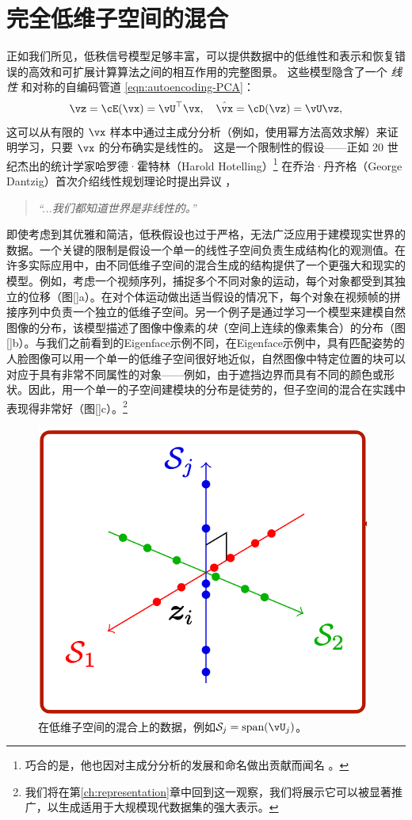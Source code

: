 \documentclass[../../book-main_zh.tex]{subfiles}
\begin{document}
\section{完全低维子空间的混合}%
\label{sec:ica}
正如我们所见，低秩信号模型足够丰富，可以提供数据中的低维性和表示和恢复错误的高效和可扩展计算算法之间的相互作用的完整图景。 
这些模型隐含了一个 \textit{线性} 和对称的自编码管道 \eqref{eqn:autoencoding-PCA}： 
\begin{equation*}
    \vz = \cE(\vx) = \vU^\top \vx, \quad \hat{\vx} = \cD(\vz) = \vU \vz,
\end{equation*}
这可以从有限的 $\vx$ 样本中通过主成分分析（例如，使用幂方法高效求解）来证明学习，只要 $\vx$ 的分布确实是线性的。
这是一个限制性的假设——正如 20 世纪杰出的统计学家哈罗德·霍特林（Harold Hotelling）\footnote{巧合的是，他也因对主成分分析的发展和命名做出贡献而闻名 \cite{Hotelling1933}。} 在乔治·丹齐格（George Dantzig）首次介绍线性规划理论时提出异议 \cite{Dantzig2002-eh}，
\begin{quote}
\centering
    \textit{“...我们都知道世界是非线性的。”}
\end{quote}

即使考虑到其优雅和简洁，低秩假设也过于严格，无法广泛应用于建模现实世界的数据。一个关键的限制是假设一个单一的线性子空间负责生成结构化的观测值。在许多实际应用中，由不同低维子空间的混合生成的结构提供了一个更强大和现实的模型。例如，考虑一个视频序列，捕捉多个不同对象的运动，每个对象都受到其独立的位移（图\ref{}a）。在对个体运动做出适当假设的情况下，每个对象在视频帧的拼接序列中负责一个独立的低维子空间\cite{VidalR2004-ECCV}。另一个例子是通过学习一个模型来建模自然图像的分布，该模型描述了图像中像素的\textit{块}（空间上连续的像素集合）的分布（图\ref{}b）。与我们之前看到的Eigenface示例不同，在Eigenface示例中，具有匹配姿势的人脸图像可以用一个单一的低维子空间很好地近似，自然图像中特定位置的块可以对应于具有非常不同属性的对象——例如，由于遮挡边界而具有不同的颜色或形状。因此，用一个单一的子空间建模块的分布是徒劳的，但子空间的混合在实践中表现得非常好（图\ref{}c）。\footnote{我们将在第\ref{ch:representation}章中回到这一观察，我们将展示它可以被显著推广，以生成适用于大规模现代数据集的强大表示。}

\begin{figure}
    \centering
    \includegraphics[width=0.35\linewidth]{chapters/subspaces.png}
    \caption{在低维子空间的混合上的数据，例如$\mathcal{S}_j = \mbox{span}(\vU_j)$。}
    \label{fig:subspaces}
\end{figure}
\end{document}
